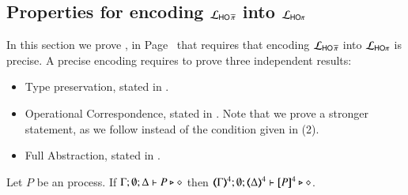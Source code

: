 \subsection{Properties for encoding $\mathcal{L}_{\mathsf{HO}\,{\widetilde{\pi}}}$ into $\mathcal{L}_{\mathsf{HO}\pi}$}
\label{app:pHOp_to_HOp}



In this section we prove , in Page~\pageref{f:enc:phopiptohopi}
that requires that encoding
$\mathcal{L}_{\mathsf{HO}\,{\widetilde{\pi}}}$ into $\mathcal{L}_{\mathsf{HO}\pi}$ is precise.
A precise encoding requires to prove three independent results:
\begin{itemize}
	\item	Type preservation, stated in .
	\item	Operational Correspondence, stated in .
		Note that we prove a stronger statement,
		as we follow 
		instead of the condition given in (2).
	\item	Full Abstraction, stated in .
\end{itemize}


\begin{proposition}\rm
	\label{app:prop:typepres_pHOp_to_HOp}
	Let $P$ be an \pHOp process.
	If $\Gamma; \emptyset; \Delta \vdash P \triangleright \diamond$ then 
	$\tmap{\Gamma}{4}; \emptyset; \tmap{\Delta}{4} \proves \pmap{P}{4} \hastype \Proc$. 
\end{proposition}

